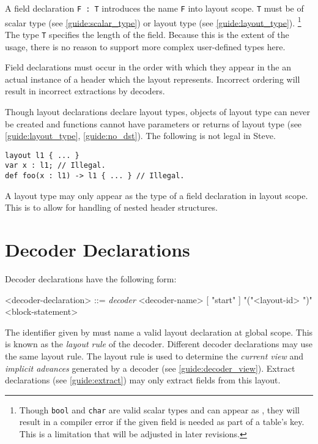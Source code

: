 A field declaration \texttt{F : T} introduces the name \texttt{F} into layout scope. \texttt{T} must be of scalar type (see \ref{guide:scalar_type}) or layout type (see \ref{guide:layout_type}).
\footnote{Though \texttt{bool} and \texttt{char} are valid scalar types and can appear as , they will result in a compiler error if the given field is needed as part of a table's key. This is a limitation that will be adjusted in later revisions.} The type \texttt{T} specifies the length of the field. Because this is the extent of the usage, there is no reason to support more complex user-defined types here.

Field declarations must occur in the order with which they appear in the an actual instance of a header which the layout represents. Incorrect ordering will result in incorrect extractions by decoders.

Though layout declarations declare layout types, objects of layout type can never be created and functions cannot have parameters or returns of layout type (see \ref{guide:layout_type}, \ref{guide:no_dst}). The following is not legal in Steve. 

\begin{minip}
\begin{lstlisting}
layout l1 { ... }
var x : l1; // Illegal.
def foo(x : l1) -> l1 { ... } // Illegal.
\end{lstlisting}
\end{minip}

A layout type may only appear as the type of a field declaration in layout scope. This is to allow for handling of nested header structures.

\section{Decoder Declarations} \label{guide:decoder}

Decoder declarations have the following form:

\begin{minip}
\begin{grammar}
<decoder-declaration> ::=
\textit{decoder} <decoder-name> [ "start" ]
"("<layout-id> ")" 
<block-statement>
\end{grammar}
\end{minip}

The identifier given by  must name a valid layout declaration at global scope. This  is known as the \textit{layout rule} of the decoder. Different decoder declarations may use the same layout rule. The layout rule is used to determine the \textit{current view} and \textit{implicit advances} generated by a decoder (see \ref{guide:decoder_view}). Extract declarations (see \ref{guide:extract}) may only extract fields from this layout.

